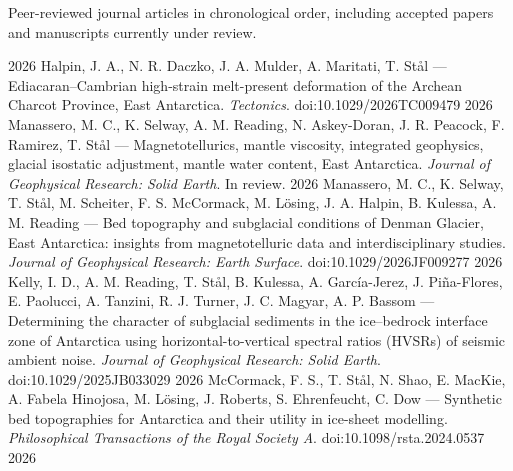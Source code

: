 \documentclass[11pt, a4paper]{cvClass}
\begin{document}
\makecvheader

\hspace{2cm}


\begin{cvparagraph}
Peer-reviewed journal articles in chronological order, including accepted papers and manuscripts currently under review.
\end{cvparagraph}

\begin{cvhonors}
  \cvhonor
    {2026}
    {Halpin, J. A., N. R. Daczko, J. A. Mulder, A. Maritati, T. Stål — Ediacaran–Cambrian high-strain melt-present deformation of the Archean Charcot Province, East Antarctica. \textit{Tectonics}. doi:10.1029/2026TC009479}
    {}
    {}
  \cvhonor
    {2026}
    {Manassero, M. C., K. Selway, A. M. Reading, N. Askey-Doran, J. R. Peacock, F. Ramirez, T. Stål — Magnetotellurics, mantle viscosity, integrated geophysics, glacial isostatic adjustment, mantle water content, East Antarctica. \textit{Journal of Geophysical Research: Solid Earth}. In review.}
    {}
    {}
  \cvhonor
    {2026}
    {Manassero, M. C., K. Selway, T. Stål, M. Scheiter, F. S. McCormack, M. Lösing, J. A. Halpin, B. Kulessa, A. M. Reading — Bed topography and subglacial conditions of Denman Glacier, East Antarctica: insights from magnetotelluric data and interdisciplinary studies. \textit{Journal of Geophysical Research: Earth Surface}. doi:10.1029/2026JF009277}
    {}
    {}
  \cvhonor
    {2026}
    {Kelly, I. D., A. M. Reading, T. Stål, B. Kulessa, A. García-Jerez, J. Piña-Flores, E. Paolucci, A. Tanzini, R. J. Turner, J. C. Magyar, A. P. Bassom — Determining the character of subglacial sediments in the ice–bedrock interface zone of Antarctica using horizontal-to-vertical spectral ratios (HVSRs) of seismic ambient noise. \textit{Journal of Geophysical Research: Solid Earth}. doi:10.1029/2025JB033029}
    {}
    {}
  \cvhonor
    {2026}
    {McCormack, F. S., T. Stål, N. Shao, E. MacKie, A. Fabela Hinojosa, M. Lösing, J. Roberts, S. Ehrenfeucht, C. Dow — Synthetic bed topographies for Antarctica and their utility in ice-sheet modelling. \textit{Philosophical Transactions of the Royal Society A}. doi:10.1098/rsta.2024.0537}
    {}
    {}
  \cvhonor
    {2026}

\end{cvhonors}
\end{document}
